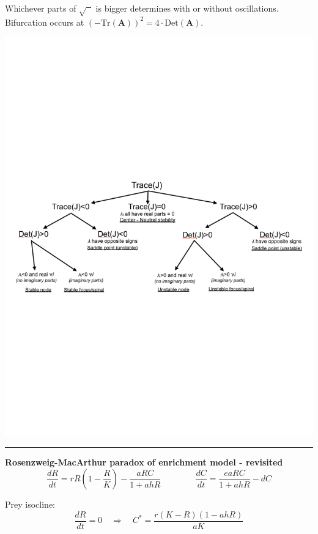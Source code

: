 \documentclass{article}
\newcommand{\ind}{\-\hspace{1cm}}
\begin{document}
\ind Whichever parts of $\sqrt{\phantom{x}}$ is bigger determines with or without oscillations.\\
\ind Bifurcation occurs at $(-\text{Tr}(\textbf{A}))^2 = 4\cdot \text{Det}(\textbf{A})$.\\
\begin{center}
 	\includegraphics[width=16cm]{figs/Classify}
\end{center}
 
\rule[0.5ex]{\linewidth}{1pt}
\pagebreak

\textbf{Rosenzweig-MacArthur paradox of enrichment model - revisited}
\begin{equation*}
	\frac{dR}{dt}=rR\left( 1-\frac{R}{K}\right) - \frac{aRC}{1+ahR} \qquad \qquad
	\frac{dC}{dt}=\frac{eaRC}{1+ahR} - dC
\end{equation*}

Prey isocline:
\begin{equation*}
	\frac{dR}{dt}=0 \quad \Rightarrow \quad C^*= \frac{r(K-R)(1-ahR)}{aK}
\end{equation*}
\end{document}

